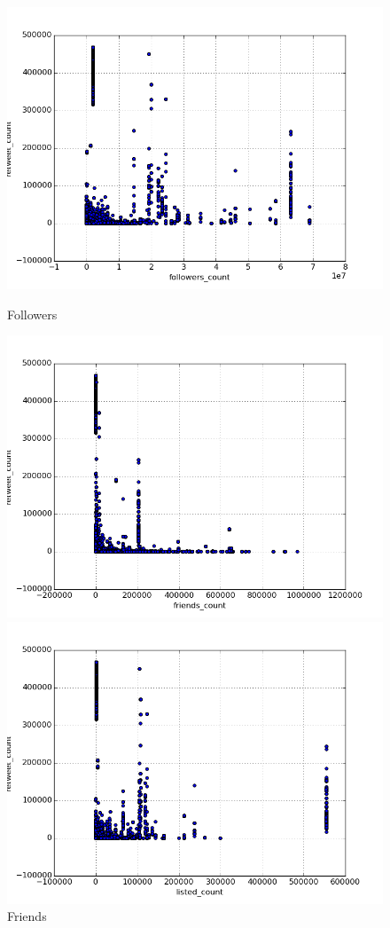 \begin{figure}[H]
    \centering
    \includegraphics[width=\linewidth]{img/followers_count.png}
    \caption{Followers}
\endminipage\hfill
{}
    \centering
    \includegraphics[width=\linewidth]{img/friends_count.png}
    \caption{Friends}
\endminipage\hfill
{}
    \centering
    \includegraphics[width=\linewidth]{img/listed_count.png}

\end{figure}
